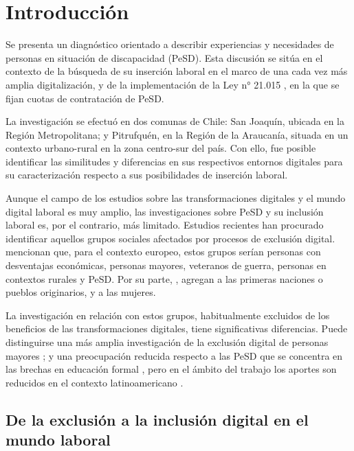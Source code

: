\section{Introducción}\label{sec-Introducción
}

Se presenta un diagnóstico orientado a describir experiencias y
necesidades de personas en situación de discapacidad (PeSD). Esta
discusión se sitúa en el contexto de la búsqueda de su inserción laboral
en el marco de una cada vez más amplia digitalización, y de la
implementación de la Ley n° 21.015 \citeauthor{CHILE2017}, en la que se fijan cuotas de
contratación de PeSD.

La investigación se efectuó en dos comunas de Chile: San Joaquín,
ubicada en la Región Metropolitana; y Pitrufquén, en la Región de la
Araucanía, situada en un contexto urbano-rural en la zona centro-sur del
país. Con ello, fue posible identificar las similitudes y diferencias en
sus respectivos entornos digitales para su caracterización respecto a
sus posibilidades de inserción laboral.

Aunque el campo de los estudios sobre las transformaciones digitales y
el mundo digital laboral es muy amplio, las investigaciones sobre PeSD y
su inclusión laboral es, por el contrario, más limitado. Estudios
recientes han procurado identificar aquellos grupos sociales afectados
por procesos de exclusión digital. \textcite[p. 2]{PETHIG2021}
mencionan que, para el contexto europeo, estos grupos serían personas
con desventajas económicas, personas mayores, veteranos de guerra,
personas en contextos rurales y PeSD. Por su parte, \textcite{LONGORIA2022},
agregan a las
primeras naciones o pueblos originarios, y a las mujeres.

La investigación en relación con estos grupos, habitualmente excluidos
de los beneficios de las transformaciones digitales, tiene
significativas diferencias. Puede distinguirse una más amplia
investigación de la exclusión digital de personas mayores \cite{BINIMELISESPINOZA2023,MARTINEZHEREDIA2020}; y una preocupación reducida
respecto a las PeSD que se concentra en las brechas en educación formal
\cite{PORTE2021}, pero en el ámbito del trabajo los aportes son
reducidos en el contexto latinoamericano {\cites[p. 4439]{LIN2018}[p. 9]{PETHIG2021}{MORALES2020}{PEREZROLDAN2021}}.

\subsection{De la exclusión a la inclusión digital en el mundo laboral}\label{sub-sec-delainclusion}

